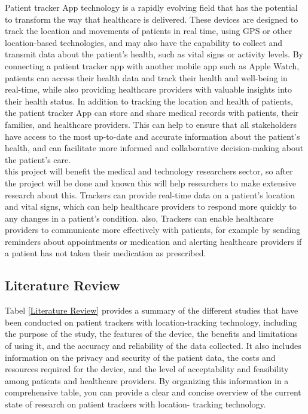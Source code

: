\documentclass[12pt]{article}
\begin{document}
			Patient tracker App technology is a rapidly evolving field that has the potential to transform the way that healthcare is delivered. These devices are designed to track the location and movements of patients in real time, using GPS or other location-based technologies, and may also have the capability to collect and transmit data about the patient's health, such as vital signs or activity levels. By connecting a patient tracker app with another mobile app such as Apple Watch, patients can access their health data and track their health and well-being in real-time, while also providing healthcare providers with valuable insights into their health status. In addition to tracking the location and health of patients, the patient tracker App can store and share medical records with patients, their families, and healthcare providers. This can help to ensure that all stakeholders have access to the most up-to-date and accurate information about the patient's health, and can facilitate more informed and collaborative decision-making about the patient's care.\\
			
			this project will benefit the medical and technology researchers sector, so after the project will be done and known this will help researchers to make extensive research about this. Trackers can provide real-time data on a patient's location and vital signs, which can help healthcare providers to respond more quickly to any changes in a patient's condition. also, Trackers can enable healthcare providers to communicate more effectively with patients, for example by sending reminders about appointments or medication and alerting healthcare providers if a patient has not taken their medication as prescribed.\\
			

		\subsection{Literature Review}
			Tabel \ref{Literature Review} provides a summary of the different studies that have been conducted on patient trackers with location-tracking technology, including the purpose of the study, the features of the device, the benefits and limitations of using it, and the accuracy and reliability of the data collected. It also includes information on the privacy and security of the patient data, the costs and resources required for the device, and the level of acceptability and feasibility among patients and healthcare providers. By organizing this information in a comprehensive table, you can provide a clear and concise overview of the current state of research on patient trackers with location- tracking technology.
			\\\\\\\\\\
			
\end{document}
